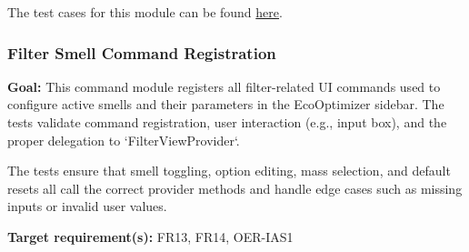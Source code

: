 \documentclass[12pt, titlepage]{article}
\begin{document}
\noindent The test cases for this module can be found
\href{https://github.com/ssm-lab/capstone--sco-vs-code-plugin/blob/plugin-multi-file/test/exportMetrics.test.ts}{here}.

\subsubsection{Filter Smell Command Registration}

\textbf{Goal:} This command module registers all filter-related UI commands used to configure active smells and their parameters in the EcoOptimizer sidebar. The tests validate command registration, user interaction (e.g., input box), and the proper delegation to `FilterViewProvider`.

\medskip

\noindent The tests ensure that smell toggling, option editing, mass selection, and default resets all call the correct provider methods and handle edge cases such as missing inputs or invalid user values.

\medskip

\noindent\textbf{Target requirement(s):} FR13, FR14, OER-IAS1~\cite{SRS} \\
\end{document}
